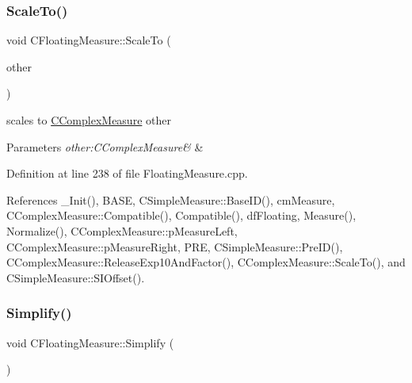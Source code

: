 \mbox{\label{classCFloatingMeasure_a841b94d2883274e67999688fad40d538}} 
\subsubsection{\texorpdfstring{Scale\+To()}{ScaleTo()}\hspace{0.1cm}{\footnotesize\ttfamily [2/2]}}
{\footnotesize\ttfamily void C\+Floating\+Measure\+::\+Scale\+To (\begin{DoxyParamCaption}\item[{const \hyperlink{classCComplexMeasure}{C\+Complex\+Measure} \&}]{other }\end{DoxyParamCaption})}



scales to \hyperlink{classCComplexMeasure}{C\+Complex\+Measure} other 


\begin{DoxyParams}{Parameters}
{\em other\+:\+C\+Complex\+Measure\&} & \\
\hline
\end{DoxyParams}


Definition at line 238 of file Floating\+Measure.\+cpp.



References \+\_\+\+Init(), B\+A\+SE, C\+Simple\+Measure\+::\+Base\+I\+D(), cm\+Measure, C\+Complex\+Measure\+::\+Compatible(), Compatible(), df\+Floating, Measure(), Normalize(), C\+Complex\+Measure\+::p\+Measure\+Left, C\+Complex\+Measure\+::p\+Measure\+Right, P\+RE, C\+Simple\+Measure\+::\+Pre\+I\+D(), C\+Complex\+Measure\+::\+Release\+Exp10\+And\+Factor(), C\+Complex\+Measure\+::\+Scale\+To(), and C\+Simple\+Measure\+::\+S\+I\+Offset().

\mbox{\label{classCFloatingMeasure_a47731afb871889ee7da5f84b40e3a27f}} 
\subsubsection{\texorpdfstring{Simplify()}{Simplify()}}
{\footnotesize\ttfamily void C\+Floating\+Measure\+::\+Simplify (\begin{DoxyParamCaption}{ }\end{DoxyParamCaption})}



